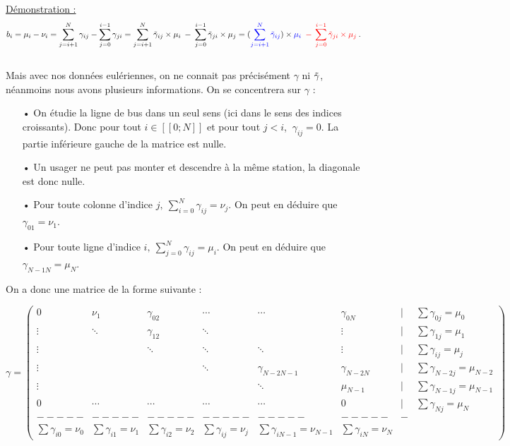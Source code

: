 \documentclass[12pt]{article}
\newcommand{\dcrochetg}{[\![}
\newcommand{\dcrochetd}{]\!]}
\newcommand{\demo}{\underline{Démonstration :} }
\begin{document}
\demo \[b_i = \mu_i - \nu_i =  \sum^N_{j=i+1} \gamma_{ij} - \sum^{i-1}_{j=0} \gamma_{ji} = \sum^N_{j=i+1} \Tilde{\gamma}_{ij}\times\mu_i\: - \:\sum^{i-1}_{j=0} \Tilde{\gamma}_{ji}\times\mu_j =  (\textcolor{blue}{\sum^N_{j=i+1} \Tilde{\gamma}_{ij}})\times\textcolor{blue}{\mu_i} \: \; \textcolor{red}{- \: \sum^{i-1}_{j=0} \Tilde{\gamma}_{ji}\times\mu_j} \:.\]
\\
Mais avec nos données eulériennes, on ne connait pas précisément $\gamma$ ni $\Tilde{\gamma}$, néanmoins nous avons plusieurs informations. On se concentrera sur $\gamma$ :\\
\begin{itemize}
    \item[•] On étudie la ligne de bus dans un seul sens (ici dans le sens des indices croissants). Donc pour tout $i \in \dcrochetg 0;N\dcrochetd$ et pour tout  $j < i$, $\: \gamma_{ij} = 0$. La partie inférieure gauche de la matrice est nulle.\\
    \item[•] Un usager ne peut pas monter et descendre à la même station, la diagonale est donc nulle.\\
    \item[•] Pour toute colonne d'indice $j, \: \sum^{N}_{i=0} \gamma_{ij} = \nu_j$. On peut en déduire que $\gamma_{01} = \nu_1$.\\
    \item[•] Pour toute ligne d'indice $i, \: \sum^{N}_{j=0} \gamma_{ij} = \mu_i$. On peut en déduire que $\gamma_{N-1N} = \mu_N$.\\
\end{itemize}
On a donc une matrice de la forme suivante :
\begin{adjustwidth}{-2cm}{-2cm}
\[\gamma = 
\begin{pmatrix}
0 & \nu_1 &\gamma_{02} & \cdots &  \cdots &\gamma_{0N} & | &\sum \gamma_{0j} = \mu_0 \\
\vdots & \ddots & \gamma_{12} & \ddots & &\vdots & | &\sum \gamma_{1j} = \mu_1 \\
\vdots & & \ddots & \ddots & \ddots & \vdots &| &\sum \gamma_{ij} = \mu_j\\
\vdots &  & & \ddots & \gamma_{N-2N-1}&\gamma_{N-2N}& |& \sum \gamma_{N-2j} = \mu_{N-2}\\
\vdots &  & & & \ddots &\mu_{N-1}& |& \sum \gamma_{N-1j} = \mu_{N-1}\\
0 & \cdots & \cdots & \cdots & \cdots & 0& | &\sum \gamma_{Nj} = \mu_N\\
----- & -----& -----&-----&-----&-----&-\\
\sum \gamma_{i0} = \nu_0 & \sum \gamma_{i1} = \nu_1 & \sum \gamma_{i2} = \nu_2 & \sum \gamma_{ij} = \nu_j & \sum \gamma_{iN-1} = \nu_{N-1} & \sum \gamma_{iN} = \nu_N
\end{pmatrix}\]
\end{adjustwidth}
\end{document}
